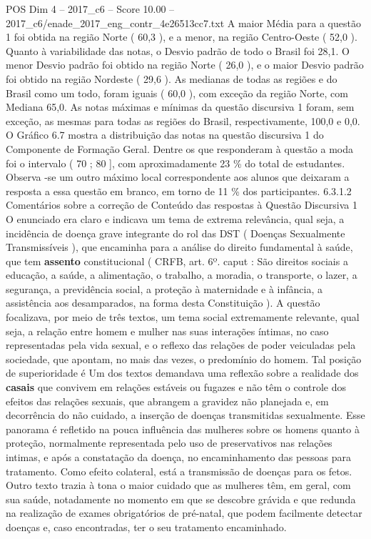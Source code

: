 \begin{textsample}{POS Dim 4 – 2017\_c6 – Score 10.00 – 2017\_c6/enade\_2017\_eng\_contr\_4e26513cc7.txt}
A maior Média para a questão 1 foi obtida na região Norte ( 60,3 ), e a menor, na região Centro-Oeste ( 52,0 ).
Quanto à variabilidade das notas, o Desvio padrão de todo o Brasil foi 28,1.
O menor Desvio padrão foi obtido na região Norte ( 26,0 ), e o maior Desvio padrão foi obtido na região Nordeste ( 29,6 ).
As medianas de todas as regiões e do Brasil como um todo, foram iguais ( 60,0 ), com exceção da região Norte, com Mediana 65,0.
As notas máximas e mínimas da questão discursiva 1 foram, sem exceção, as mesmas para todas as regiões do Brasil, respectivamente, 100,0 e 0,0.
O Gráfico 6.7 mostra a distribuição das notas na questão discursiva 1 do Componente de Formação Geral.
Dentre os que responderam à questão a moda foi o intervalo ( 70 ; 80 ], com aproximadamente 23 \% do total de estudantes.
Observa -se um outro máximo local correspondente aos alunos que deixaram a resposta a essa questão em branco, em torno de 11 \% dos participantes. 6.3.1.2 Comentários sobre a correção de Conteúdo das respostas à Questão Discursiva 1 O enunciado era claro e indicava um tema de extrema relevância, qual seja, a incidência de doença grave integrante do rol das DST ( Doenças Sexualmente Transmissíveis ), que encaminha para a análise do direito fundamental à saúde, que tem \textbf{assento} constitucional ( CRFB, art. 6º. caput : São direitos sociais a educação, a saúde, a alimentação, o trabalho, a moradia, o transporte, o lazer, a segurança, a previdência social, a proteção à maternidade e à infância, a assistência aos desamparados, na forma desta Constituição ).
A questão focalizava, por meio de três textos, um tema social extremamente relevante, qual seja, a relação entre homem e mulher nas suas interações íntimas, no caso representadas pela vida sexual, e o reflexo das relações de poder veiculadas pela sociedade, que apontam, no mais das vezes, o predomínio do homem.
Tal posição de superioridade é Um dos textos demandava uma reflexão sobre a realidade dos \textbf{casais} que convivem em relações estáveis ou fugazes e não têm o controle dos efeitos das relações sexuais, que abrangem a gravidez não planejada e, em decorrência do não cuidado, a inserção de doenças transmitidas sexualmente.
Esse panorama é refletido na pouca influência das mulheres sobre os homens quanto à proteção, normalmente representada pelo uso de preservativos nas relações intimas, e após a constatação da doença, no encaminhamento das pessoas para tratamento.
Como efeito colateral, está a transmissão de doenças para os fetos.
Outro texto trazia à tona o maior cuidado que as mulheres têm, em geral, com sua saúde, notadamente no momento em que se descobre grávida e que redunda na realização de exames obrigatórios de pré-natal, que podem facilmente detectar doenças e, caso encontradas, ter o seu tratamento encaminhado.

\end{textsample}
